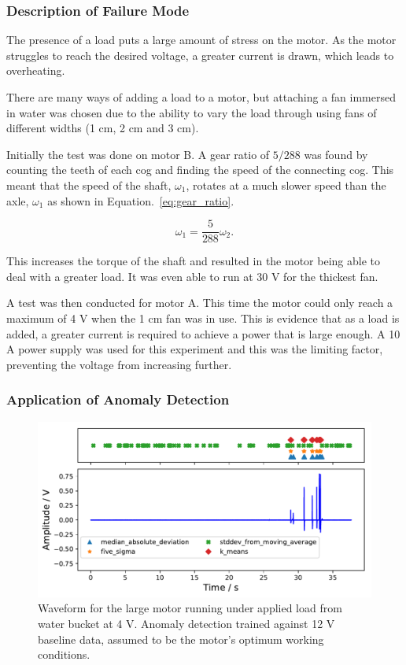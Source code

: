 \subsubsection{Description of Failure Mode}
The presence of a load puts a large amount of stress on the motor. As the motor struggles to reach the desired voltage, a greater current is drawn, which leads to overheating.
        
There are many ways of adding a load to a motor, but attaching a fan immersed in water was chosen due to the ability to vary the load through using fans of different widths (1 cm, 2 cm and 3 cm).
    
Initially the test was done on motor B. A gear ratio of ${5}/{288}$ was found by counting the teeth of each cog and finding the speed of the connecting cog. This meant that the speed of the shaft, $\omega_1$, rotates at a much slower speed than the axle, $\omega _1$ as shown in Equation.~\eqref{eq:gear_ratio}.

\begin{equation}
\omega_1 = \frac{5}{288} \omega_2.
\label{eq:gear_ratio}
\end{equation}

This increases the torque of the shaft and resulted in the motor being able to deal with a greater load. It was even able to run at 30 V for the thickest fan.

A test was then conducted for motor A. This time the motor could only reach a maximum of 4 V when the 1 cm fan was in use. This is evidence that as a load is added, a greater current is required to achieve a power that is large enough. A 10 A power supply was used for this experiment and this was the limiting factor, preventing the voltage from increasing further.

\subsubsection{Application of Anomaly Detection}

\begin{figure}[t]
    \includegraphics[width=1.0\textwidth]{fig/large_4V-9A_water_large_12V.pdf}
    \caption[Anomaly Plot Large Motor under Load]{Waveform for the large motor running under applied load from water bucket at 4 V. Anomaly detection trained against 12 V baseline data, assumed to be the motor's optimum working conditions.}
    \label{fig:largemotor_water4V}
\end{figure}

